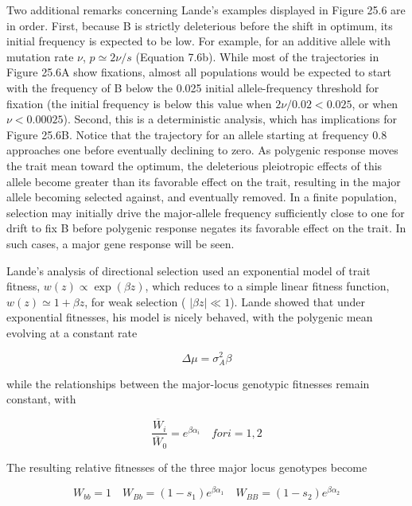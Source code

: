 \documentclass{article}
\begin{document}
Two additional remarks concerning Lande's examples displayed in Figure 25.6 are in order. First, because B is strictly deleterious before the shift in optimum, its initial frequency is expected to be low. For example, for an additive allele with mutation rate  $ \nu $,  $ p \simeq 2\nu/s $ (Equation 7.6b). While most of the trajectories in Figure 25.6A show fixations, almost all populations would be expected to start with the frequency of B below the 0.025 initial allele-frequency threshold for fixation (the initial frequency is below this value when  $ 2\nu/0.02 < 0.025 $, or when  $ \nu < 0.00025 $). Second, this is a deterministic analysis, which has implications for Figure 25.6B. Notice that the trajectory for an allele starting at frequency 0.8 approaches one before eventually declining to zero. As polygenic response moves the trait mean toward the optimum, the deleterious pleiotropic effects of this allele become greater than its favorable effect on the trait, resulting in the major allele becoming selected against, and eventually removed. In a finite population, selection may initially drive the major-allele frequency sufficiently close to one for drift to fix B before polygenic response negates its favorable effect on the trait. In such cases, a major gene response will be seen.

Lande's analysis of directional selection used an exponential model of trait fitness,  $ w(z) \propto \exp(\beta z) $, which reduces to a simple linear fitness function,  $ w(z) \simeq 1 + \beta z $, for weak selection ( $ |\beta z| \ll 1 $). Lande showed that under exponential fitnesses, his model is nicely behaved, with the polygenic mean evolving at a constant rate

\begin{equation}
\Delta\mu=\sigma_{A}^{2}\beta
\tag{25.9a}
\label{eq:25_9a}
\end{equation}

while the relationships between the major-locus genotypic fitnesses remain constant, with

\begin{equation}
\frac{\overline{W}_{i}}{\overline{W}_{0}}=e^{\beta\alpha_{i}}\quad for i=1,2
\tag{25.9b}
\label{eq:25_9b}
\end{equation}

The resulting relative fitnesses of the three major locus genotypes become

\begin{equation}
W_{b b}=1\quad W_{B b}=\left(1-s_{1}\right)e^{\beta\alpha_{1}}\quad W_{B B}=\left(1-s_{2}\right)e^{\beta\alpha_{2}}
\tag{25.9c}
\label{eq:25_9c}
\end{equation}
\end{document}
